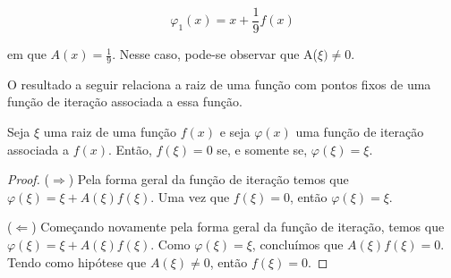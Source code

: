 \begin{equation*}
    \varphi_1(x) = x + \frac{1}{9}f(x)
\end{equation*}

em que $A(x) = \frac{1}{9}$. Nesse caso, pode-se observar que A($\xi) \neq 0$.

O resultado a seguir relaciona a raiz de uma função com pontos fixos de uma função de iteração associada a essa função. 

\begin{prop}
Seja $\xi$ uma raiz de uma função $f(x)$ e seja $\varphi(x)$ uma função de iteração associada a $f(x)$. Então, $f(\xi) = 0$ se, e somente se, $\varphi(\xi) = \xi$.
\end{prop}


\begin{proof}
($\Rightarrow$) Pela forma geral da função de iteração temos que $\varphi(\xi) = \xi + A(\xi)f(\xi)$. Uma vez que $f(\xi) = 0$, então $\varphi(\xi) = \xi$.

($\Leftarrow$) Começando novamente pela forma geral da função de iteração, temos que $\varphi(\xi) = \xi + A(\xi)f(\xi)$. Como $\varphi(\xi) = \xi$, concluímos que $A(\xi) f(\xi) = 0$. Tendo como hipótese que $A(\xi) \neq 0$, então $f(\xi) = 0$.
\end{proof}



